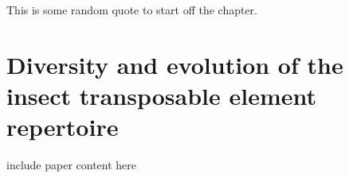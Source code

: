 \begin{savequote}[75mm]
This is some random quote to start off the chapter.
\end{savequote}

\chapter{Diversity and evolution of the insect transposable element
repertoire}
\label{cha:mobilome}

include paper content here
